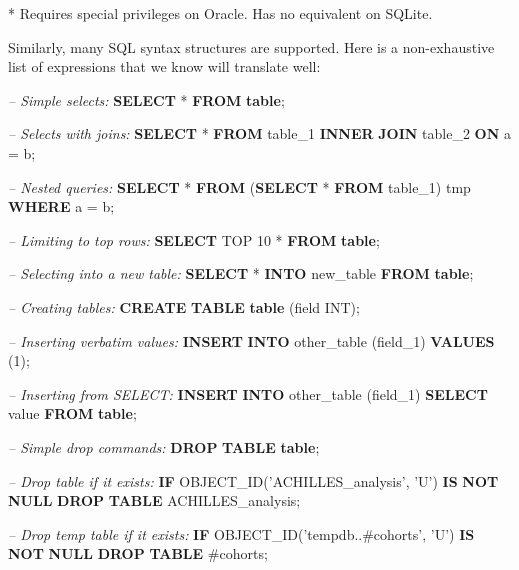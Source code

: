 \documentclass[11pt]{book}
\newenvironment{Shaded}{\begin{snugshade}}{\end{snugshade}}
\newcommand{\KeywordTok}[1]{\textcolor[rgb]{0.13,0.29,0.53}{\textbf{#1}}}
\newcommand{\DataTypeTok}[1]{\textcolor[rgb]{0.13,0.29,0.53}{#1}}
\newcommand{\DecValTok}[1]{\textcolor[rgb]{0.00,0.00,0.81}{#1}}
\newcommand{\StringTok}[1]{\textcolor[rgb]{0.31,0.60,0.02}{#1}}
\newcommand{\CommentTok}[1]{\textcolor[rgb]{0.56,0.35,0.01}{\textit{#1}}}
\newcommand{\FunctionTok}[1]{\textcolor[rgb]{0.00,0.00,0.00}{#1}}
\newcommand{\NormalTok}[1]{#1}
\theoremstyle{definition}
\theoremstyle{definition}
\theoremstyle{definition}
\theoremstyle{remark}
\begin{document}
* Requires special privileges on Oracle. Has no equivalent on SQLite.

Similarly, many SQL syntax structures are supported. Here is a
non-exhaustive list of expressions that we know will translate well:

\begin{Shaded}
\begin{Highlighting}[]
\CommentTok{-- Simple selects:}
\KeywordTok{SELECT}\NormalTok{ * }\KeywordTok{FROM} \KeywordTok{table}\NormalTok{;}

\CommentTok{-- Selects with joins:}
\KeywordTok{SELECT}\NormalTok{ * }\KeywordTok{FROM}\NormalTok{ table_1 }\KeywordTok{INNER} \KeywordTok{JOIN}\NormalTok{ table_2 }\KeywordTok{ON}\NormalTok{ a = b;}

\CommentTok{-- Nested queries:}
\KeywordTok{SELECT}\NormalTok{ * }\KeywordTok{FROM}\NormalTok{ (}\KeywordTok{SELECT}\NormalTok{ * }\KeywordTok{FROM}\NormalTok{ table_1) tmp }\KeywordTok{WHERE}\NormalTok{ a = b;}

\CommentTok{-- Limiting to top rows:}
\KeywordTok{SELECT}\NormalTok{ TOP }\DecValTok{10}\NormalTok{ * }\KeywordTok{FROM} \KeywordTok{table}\NormalTok{;}

\CommentTok{-- Selecting into a new table:}
\KeywordTok{SELECT}\NormalTok{ * }\KeywordTok{INTO}\NormalTok{ new_table }\KeywordTok{FROM} \KeywordTok{table}\NormalTok{;}

\CommentTok{-- Creating tables:}
\KeywordTok{CREATE} \KeywordTok{TABLE} \KeywordTok{table}\NormalTok{ (field }\DataTypeTok{INT}\NormalTok{);}

\CommentTok{-- Inserting verbatim values:}
\KeywordTok{INSERT} \KeywordTok{INTO}\NormalTok{ other_table (field_1) }\KeywordTok{VALUES}\NormalTok{ (}\DecValTok{1}\NormalTok{);}

\CommentTok{-- Inserting from SELECT:}
\KeywordTok{INSERT} \KeywordTok{INTO}\NormalTok{ other_table (field_1) }\KeywordTok{SELECT} \FunctionTok{value} \KeywordTok{FROM} \KeywordTok{table}\NormalTok{;}
  
\CommentTok{-- Simple drop commands:}
\KeywordTok{DROP} \KeywordTok{TABLE} \KeywordTok{table}\NormalTok{;}

\CommentTok{-- Drop table if it exists:}
\KeywordTok{IF}\NormalTok{ OBJECT_ID(}\StringTok{'ACHILLES_analysis'}\NormalTok{, }\StringTok{'U'}\NormalTok{) }\KeywordTok{IS} \KeywordTok{NOT} \KeywordTok{NULL}
  \KeywordTok{DROP} \KeywordTok{TABLE}\NormalTok{ ACHILLES_analysis;}
  
\CommentTok{-- Drop temp table if it exists:}
\KeywordTok{IF}\NormalTok{ OBJECT_ID(}\StringTok{'tempdb..#cohorts'}\NormalTok{, }\StringTok{'U'}\NormalTok{) }\KeywordTok{IS} \KeywordTok{NOT} \KeywordTok{NULL}
  \KeywordTok{DROP} \KeywordTok{TABLE}\NormalTok{ #cohorts;  }


\end{Highlighting}
\end{Shaded}
\end{document}
